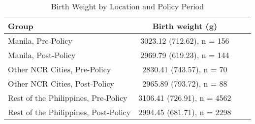 \begin{table}[!h]
\centering
\caption{Birth Weight by Location and Policy Period}
\centering
\begin{tabular}[t]{l cl c}
\toprule
Group & Birth weight (g)\\
\midrule
Manila, Pre-Policy & 3023.12 (712.62), n = 156\\
Manila, Post-Policy & 2969.79 (619.23), n = 144\\
Other NCR Cities, Pre-Policy & 2830.41 (743.57), n = 70\\
Other NCR Cities, Post-Policy & 2965.89 (793.72), n = 88\\
Rest of the Philippines, Pre-Policy & 3106.41 (726.91), n = 4562\\
\addlinespace
Rest of the Philippines, Post-Policy & 2994.45 (681.71), n = 2298\\
\bottomrule
\end{tabular}
\end{table}
